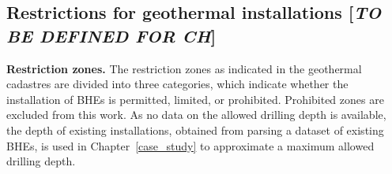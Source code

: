 \subsection{Restrictions for geothermal installations [\textit{TO BE DEFINED FOR CH}]}

\textbf{Restriction zones.}
The restriction zones as indicated in the geothermal cadastres \cite{asit_vd_cadastre_2019-1,sitg_cadastre_2019} are divided into three categories, which indicate whether the installation of BHEs is permitted, limited, or prohibited.
Prohibited zones are excluded from this work. 
As no data on the allowed drilling depth is available, the depth of existing installations, obtained from parsing a dataset of existing BHEs, is used in Chapter~\ref{case_study} to approximate a maximum allowed drilling depth.
